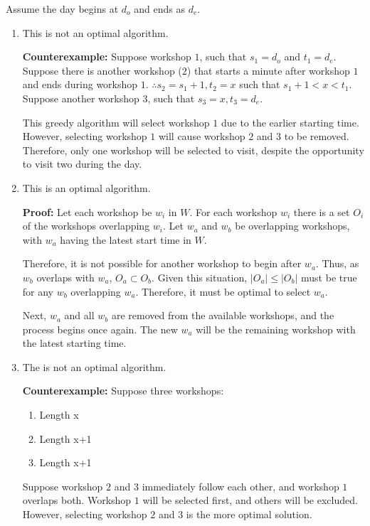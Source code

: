 \documentclass{article}
\begin{document}
Assume the day begins at $d_o$ and ends as $d_e$.

\begin{enumerate}[label=(\alph*)]
    \item This is not an optimal algorithm.

    \textbf{Counterexample:} Suppose workshop $1$, such that $s_1 = d_o$
    and $t_1 = d_e$. Suppose there is another workshop ($2$) that starts a minute
    after workshop $1$ and ends during workshop $1$. $\therefore s_2=s_1 + 1, t_2=x$
    such that $s_1+1 < x < t_1$. Suppose another workshop $3$, such that 
    $s_3 = x, t_3 = d_e$.

    This greedy algorithm will select workshop $1$ due to the earlier starting time.
    However, selecting workshop $1$ will cause workshop $2$ and $3$ to be removed.
    Therefore, only one workshop will be selected to visit,
    despite the opportunity to visit two during the day.

    \item This is an optimal algorithm.
    
    \textbf{Proof:} Let each workshop be $w_i$ in $W$.
    For each workshop $w_i$ there is a set $O_i$ of the workshops overlapping $w_i$.
    Let $w_a$ and $w_b$ be overlapping workshops,
    with $w_a$ having the latest start time in $W$.

    Therefore, it is not possible for another workshop to begin after $w_a$.
    Thus, as $w_b$ overlaps with $w_a$, $O_a \subset O_b$.
    Given this situation, $|O_a| \leq |O_b|$ must be true for any $w_b$ overlapping $w_a$.
    Therefore, it must be optimal to select $w_a$.

    Next, $w_a$ and all $w_b$ are removed from the available workshops,
    and the process begins once again.
    The new $w_a$ will be the remaining workshop with the latest starting time.

    \item The is not an optimal algorithm.
    
    \textbf{Counterexample:} Suppose three workshops:
        \begin{enumerate}[label=\arabic*]
            \item Length x
            \item Length x+1
            \item Length x+1
        \end{enumerate}

        Suppose workshop $2$ and $3$ immediately follow each other, and workshop $1$ overlaps both.
        Workshop $1$ will be selected first, and others will be excluded.
        However, selecting workshop $2$ and $3$ is the more optimal solution.
\end{enumerate}
\end{document}
